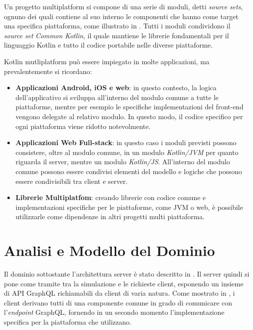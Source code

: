 Un progetto multiplatform si compone di una serie di moduli, detti \textit{source sets}, ognuno dei quali contiene al suo interno le componenti che
hanno come target una specifica piattaforma, come illustrato in . Tutti i moduli condividono il \textit {source set} \textit{Common Kotlin}, il quale mantiene le librerie
fondamentali per il linguaggio Kotlin e tutto il codice portabile nelle diverse piattaforme.


Kotlin mutliplatform può essere impiegato in molte applicazioni, ma prevalentemente si ricordano:
\begin{itemize}
    \item \textbf{Applicazioni Android, iOS e web}: in questo contesto, la logica dell'applicativo si sviluppa all'interno del modulo comune a tutte
        le piattaforme, mentre per esempio le specifiche implementazioni del front-end vengono delegate al relativo modulo. In questo modo, il codice
        specifico per ogni piattaforma viene ridotto notevolmente.
    \item \textbf{Applicazioni Web Full-stack}: in questo caso i moduli previsti possono consistere, oltre al modulo comune, in un modulo \textit{Kotlin/JVM}
        per quanto riguarda il server, mentre un modulo \textit{Kotlin/JS}. All'interno del modulo comune possono essere condivisi elementi del modello e
        logiche che possono essere condivisibili tra client e server.
    \item \textbf{Librerie Multiplatfom}: creando librerie con codice comune e implementazioni specifiche per le piattaforme, come JVM o web, è possibile
        utilizzarle come dipendenze in altri progetti multi piattaforma.
\end{itemize}

\section{Analisi e Modello del Dominio}\label{sec:domain-model}
Il dominio sottostante l'architettura server è stato descritto in . Il server quindi si pone come tramite tra la simulazione e le 
richieste client, esponendo un insieme di API GraphQL richiamabili da client di varia natura. Come mostrato in , i client derivano
tutti di una componente comune in grado di comunicare con l'\textit{endpoint} GraphQL, fornendo in un secondo momento l'implementazione specifica per
la piattaforma che utilizzano.


